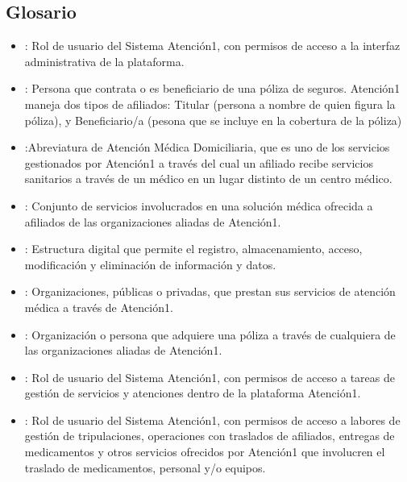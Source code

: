 \documentclass[letterpaper,10pt,spanish]{sphinxmanual}
\begin{document}
\subsection{Glosario}
\label{\detokenize{glosario:glosario}}\label{\detokenize{glosario::doc}}\begin{itemize}
\item {} 
: Rol de usuario del Sistema Atención\sphinxhyphen{}1, con permisos de acceso a la interfaz administrativa de la plataforma.

\item {} 
: Persona que contrata o es beneficiario de una póliza de seguros. Atención\sphinxhyphen{}1 maneja dos tipos de afiliados: Titular (persona a nombre de quien figura la póliza), y Beneficiario/a (pesona que se incluye en la cobertura de la póliza)

\item {} 
:Abreviatura de Atención Médica Domiciliaria, que es uno de los servicios gestionados por Atención\sphinxhyphen{}1 a través del cual un afiliado recibe servicios sanitarios a través de un médico en un lugar distinto de un centro médico.

\item {} 
: Conjunto de servicios involucrados en una solución médica ofrecida a afiliados de las organizaciones aliadas de Atención\sphinxhyphen{}1.

\item {} 
: Estructura digital que permite el registro, almacenamiento, acceso, modificación y eliminación de información y datos.

\item {} 
: Organizaciones, públicas o privadas, que prestan sus servicios de atención médica a través de Atención\sphinxhyphen{}1.

\item {} 
: Organización o persona que adquiere una póliza a través de cualquiera de las organizaciones aliadas de Atención\sphinxhyphen{}1.

\item {} 
: Rol de usuario del Sistema Atención\sphinxhyphen{}1, con permisos de acceso a tareas de gestión de servicios y atenciones dentro de la plataforma Atención\sphinxhyphen{}1.

\item {} 
: Rol de usuario del Sistema Atención\sphinxhyphen{}1, con permisos de acceso a labores de gestión de tripulaciones, operaciones con traslados de afiliados, entregas de medicamentos y otros servicios ofrecidos por Atención\sphinxhyphen{}1 que involucren el traslado de medicamentos, personal y/o equipos.


\end{itemize}
\end{document}
